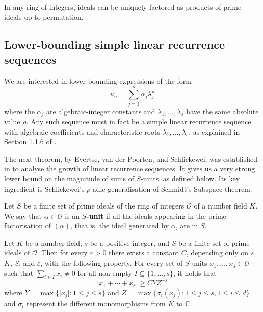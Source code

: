 \begin{theorem}
In any ring of integers, ideals can be uniquely factored as products of prime ideals up to permutation.
\end{theorem}

\subsection{Lower-bounding simple linear recurrence sequences}

We are interested in lower-bounding expressions of the form
\begin{equation}
\label{eq:sum}
u_n=\sum\limits_{j=1}^s\alpha_j\lambda_j^n
\end{equation}
where the $\alpha_j$ are algebraic-integer constants and $\lambda_1,\ldots,\lambda_s$ have the same absolute value $\rho$. Any such sequence must in fact be a simple linear recurrence sequence with algebraic coefficients and characteristic roots $\lambda_1,\ldots,\lambda_s$, as explained in Section 1.1.6 of \cite{BOOK}.

The next theorem, by Evertse, van der Poorten, and Schlickewei, was established in \cite{Evertse84,PS82} to
analyse the growth of linear recurrence sequences. It gives us a very strong lower bound on the magnitude of sums of $S$-units, as defined below. Its key ingredient is Schlickewei's $p$-adic generalisation \cite{Sch77} of Schmidt's
Subspace theorem.

Let $S$ be a finite set of prime ideals of the ring of integers
$\mathcal{O}$ of a number field $K$. We say that
$\alpha\in\mathcal{O}$ is an \textbf{$S$-unit} if all the ideals
appearing in the prime factorisation of $(\alpha)$, that is, the ideal
generated by $\alpha$, are in $S$.

\begin{theorem}[$S$-units]
\label{thm:s-units}
Let $K$ be a number field, $s$ be a positive integer, and $S$ be a
finite set of prime ideals of $\mathcal{O}$. Then for every
$\varepsilon>0$ there exists a constant $C$, depending only on $s$,
$K$, $S$, and $\varepsilon$, with the following property. For every
set of $S$-units $x_1,\ldots,x_s\in\mathcal{O}$ such that
$\sum\limits_{i\in I} x_i\neq 0$ for all non-empty $I\subseteq\lbrace
1,\ldots,s\rbrace$, it holds that
\[ \lvert x_1+\cdots+x_s \rvert\geq CYZ^{-\varepsilon} \]
where $Y=\max\lbrace \lvert x_j\rvert : 1\leq j\leq s \rbrace$ and $Z=\max\lbrace \sigma_i(x_j): 1\leq j\leq s,1\leq i\leq d \rbrace$ and $\sigma_i$ represent the different monomorphisms from $K$ to $\mathbb{C}$.
\end{theorem}

